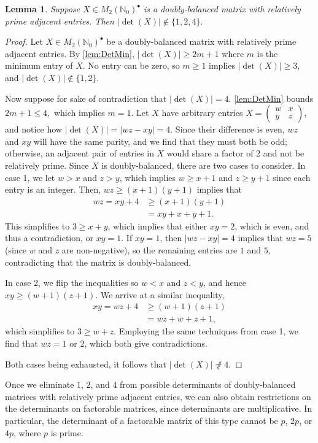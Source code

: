 \documentclass{amsart}
\newcommand{\pmx}[4]{\begin{pmatrix} #1 & #2 \\ #3 & #4 \end{pmatrix}}
\newcommand{\mtwo}{M_2(\mathbb{N}_0)^\bullet}
\newcommand{\absdet}[1]{\left|\det\left( #1 \right)\right|}
\newtheorem{lemma}[theorem]{Lemma}
\begin{document}
\begin{lemma} \label{lem:Det124}
    Suppose $X\in \mtwo$ is a doubly-balanced matrix with relatively prime adjacent entries. Then $\absdet{X}\not \in \{1,2,4\}.$ 
\end{lemma}
\begin{proof}
     Let $X\in \mtwo$ be a doubly-balanced matrix with relatively prime adjacent entries. By \cref{lem:DetMin}, $\absdet{X} \ge 2m+1$ where $m$ is the minimum entry of $X$. No entry can be zero, so $m \ge  1$ implies $\absdet{X}\ge 3,$ and $\absdet{X} \not \in \{1,2\}.$

     Now suppose for sake of contradiction that $\absdet{X}=4$. \cref{lem:DetMin} bounds $2m+1\le 4,$ which implies $m=1$. Let $X$ have arbitrary entries $X=\pmx{w}{x}{y}{z}$,  and notice how $\absdet{X}=|wz-xy|=4$. Since their difference is even, $wz$ and $xy$ will have the same parity, and we find that they must both be odd; otherwise, an adjacent pair of entries in $X$ would share a factor of $2$ and not be relatively prime. Since $X$ is doubly-balanced, there are two cases to consider. In case 1, we let $w>x$ and $z>y$, which implies $w\geq x+1$ and $z\geq y+1$ since each entry is an integer.  Then, $wz \ge (x+1)(y+1)$ implies that
     \begin{align*}
     wz=xy+4 &\ge (x+1)(y+1)\\
     &= xy+x+y+1.
     \end{align*}
      This simplifies to $3\ge x+y$, which implies that either $xy=2$, which is even, and thus a contradiction, or $xy=1$. If $xy=1$, then $|wz-xy|=4$ implies that $wz=5$ (since $w$ and $z$ are non-negative), so the remaining entries are $1$ and $5$, contradicting that the matrix is doubly-balanced. 
     
     In case 2, we flip the inequalities so $w<x$ and $z<y$, and hence $xy \ge (w+1)(z+1)$. We arrive at a similar inequality,
     \begin{align*}
     xy=wz+4 &\ge (w+1)(z+1)\\
     &= wz+w+z+1,
     \end{align*}
     which simplifies to $3\ge w+z$. Employing the same techniques from case 1, we find that $wz=1$ or $2$, which both give contradictions. 
     
     Both cases being exhausted, it follows that $\absdet{X}\not \neq {4}$.
\end{proof}

Once we eliminate $1$, $2$, and $4$ from possible determinants of doubly-balanced matrices with relatively prime adjacent entries, we can also obtain restrictions on the determinants on factorable matrices, since determinants are multiplicative. In particular, the determinant of a factorable matrix of this type cannot be $p$, $2p$, or $4p$, where $p$ is prime.
\end{document}
